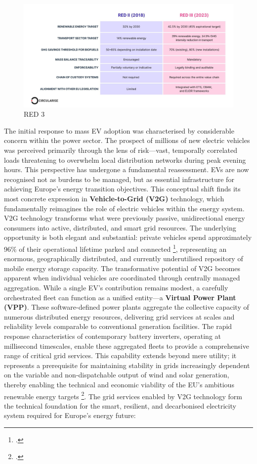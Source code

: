 \begin{figure}[H]
    \centering
    \includegraphics[width=0.75\linewidth]{red.jpg}
    \caption{RED 3}
    \label{fig:placeholder}
\end{figure}
\noindent
The initial response to mass EV adoption was characterised by considerable concern within the power sector. The prospect of millions of new electric vehicles was perceived primarily through the lens of risk—vast, temporally correlated loads threatening to overwhelm local distribution networks during peak evening hours. This perspective has undergone a fundamental reassessment. EVs are now recognised not as burdens to be managed, but as essential infrastructure for achieving Europe's energy transition objectives. This conceptual shift finds its most concrete expression in \textbf{Vehicle-to-Grid (V2G)} technology, which fundamentally reimagines the role of electric vehicles within the energy system.
\noindent
V2G technology transforms what were previously passive, unidirectional energy consumers into active, distributed, and smart grid resources. The underlying opportunity is both elegant and substantial: private vehicles spend approximately 96\% of their operational lifetime parked and connected \footcite{evertsson2024investigating}, representing an enormous, geographically distributed, and currently underutilised repository of mobile energy storage capacity.
\noindent
The transformative potential of V2G becomes apparent when individual vehicles are coordinated through centrally managed aggregation. While a single EV's contribution remains modest, a carefully orchestrated fleet can function as a unified entity—a \textbf{Virtual Power Plant (VPP)}. These software-defined power plants aggregate the collective capacity of numerous distributed energy resources, delivering grid services at scales and reliability levels comparable to conventional generation facilities. The rapid response characteristics of contemporary battery inverters, operating at millisecond timescales, enable these aggregated fleets to provide a comprehensive range of critical grid services. This capability extends beyond mere utility; it represents a prerequisite for maintaining stability in grids increasingly dependent on the variable and non-dispatchable output of wind and solar generation, thereby enabling the technical and economic viability of the EU's ambitious renewable energy targets \footcite{Tavakoli2019}.
\noindent
The grid services enabled by V2G technology form the technical foundation for the smart, resilient, and decarbonised electricity system required for Europe's energy future:

